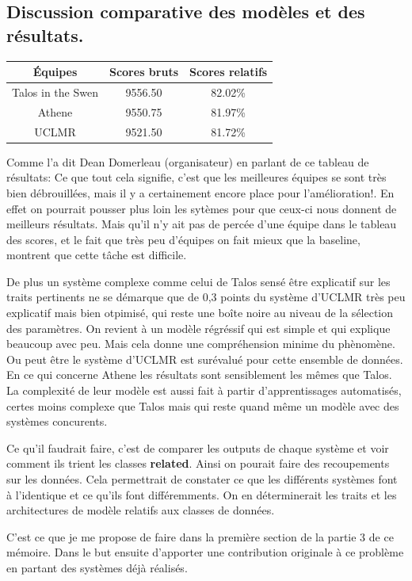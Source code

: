 \documentclass[onecolumn, 12pt]{article}
\begin{document}
\subsection{Discussion comparative des modèles et des résultats.}
\begin{center}
 \begin{tabular}{| c || c | c | }
  \hline
  \textbf{Équipes} & \textbf{Scores bruts} & \textbf{Scores relatifs} \\
  \hline
  Talos in the Swen & 9556.50               & 82.02\%                  \\
  Athene            & 9550.75               & 81.97\%                  \\
  UCLMR             & 9521.50               & 81.72\%                  \\
  \hline
 \end{tabular}
\end{center}

Comme l'a dit Dean Domerleau (organisateur) en parlant de ce tableau de résultats: \og Ce que tout cela signifie, c'est que les meilleures équipes se sont très bien débrouillées, mais il y a certainement encore place pour l'amélioration!\fg.
En effet on pourrait pousser plus loin les sytèmes pour que ceux-ci nous donnent de meilleurs résultats.
Mais qu'il n'y ait pas de percée d'une équipe dans le tableau des scores, et le fait que très peu d'équipes on fait mieux que la baseline, montrent que cette tâche est difficile.

De plus un système complexe comme celui de Talos sensé être explicatif sur les traits pertinents ne se démarque que de 0,3 points du système d'UCLMR très peu explicatif mais bien otpimisé, qui reste une boîte noire au niveau de la sélection des paramètres.
On revient à un modèle régréssif qui est simple et qui explique beaucoup avec peu.
Mais cela donne une compréhension minime du phènomène.
Ou peut être le système d'UCLMR est surévalué pour cette ensemble de données.
En ce qui concerne Athene les résultats sont sensiblement les mêmes que Talos.
La complexité de leur modèle est aussi fait à partir d'apprentissages automatisés, certes moins complexe que Talos mais qui reste quand même un modèle avec des systèmes concurents.

Ce qu'il faudrait faire, c'est de comparer les outputs de chaque système et voir comment ils trient les classes \textbf{related}.
Ainsi on pourait faire des recoupements sur les données.
Cela permettrait de constater ce que les différents systèmes font à l'identique et ce qu'ils font différemments.
On en déterminerait les traits et les architectures de modèle relatifs aux classes de données.

C'est ce que je me propose de faire dans la première section de la partie 3 de ce mémoire.
Dans le but ensuite d'apporter une contribution originale à ce problème en partant des systèmes déjà réalisés.
\end{document}
